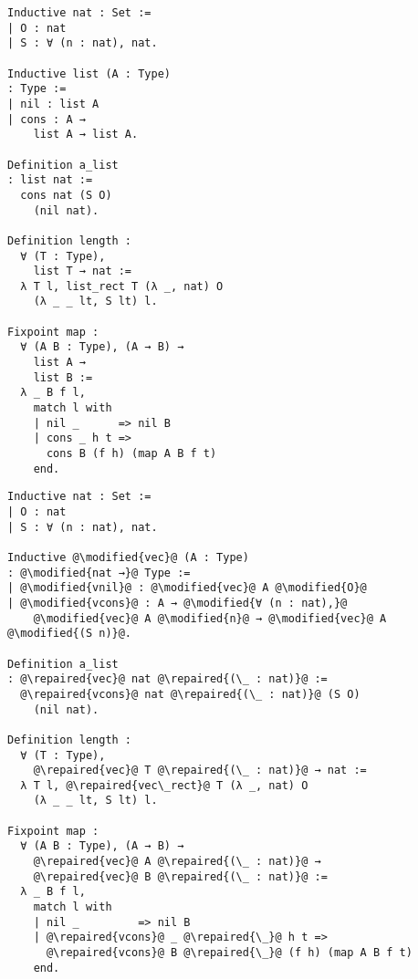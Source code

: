 \begin{figure*}[!htp]

  \noindent%
  \begin{minipage}[t]{0.50\textwidth}
    \begin{verbatim}
Inductive nat : Set :=
| O : nat
| S : ∀ (n : nat), nat.

Inductive list (A : Type)
: Type :=
| nil : list A
| cons : A →
    list A → list A.

Definition a_list
: list nat :=
  cons nat (S O)
    (nil nat).

Definition length :
  ∀ (T : Type),
    list T → nat :=
  λ T l, list_rect T (λ _, nat) O
    (λ _ _ lt, S lt) l.

Fixpoint map :
  ∀ (A B : Type), (A → B) →
    list A →
    list B :=
  λ _ B f l,
    match l with
    | nil _      => nil B
    | cons _ h t =>
      cons B (f h) (map A B f t)
    end.
  \end{verbatim}
\end{minipage}%
\begin{minipage}[t]{0.50\textwidth}
  \begin{verbatim}
Inductive nat : Set :=
| O : nat
| S : ∀ (n : nat), nat.

Inductive @\modified{vec}@ (A : Type)
: @\modified{nat →}@ Type :=
| @\modified{vnil}@ : @\modified{vec}@ A @\modified{O}@
| @\modified{vcons}@ : A → @\modified{∀ (n : nat),}@
    @\modified{vec}@ A @\modified{n}@ → @\modified{vec}@ A @\modified{(S n)}@.

Definition a_list
: @\repaired{vec}@ nat @\repaired{(\_ : nat)}@ :=
  @\repaired{vcons}@ nat @\repaired{(\_ : nat)}@ (S O)
    (nil nat).

Definition length :
  ∀ (T : Type),
    @\repaired{vec}@ T @\repaired{(\_ : nat)}@ → nat :=
  λ T l, @\repaired{vec\_rect}@ T (λ _, nat) O
    (λ _ _ lt, S lt) l.

Fixpoint map :
  ∀ (A B : Type), (A → B) →
    @\repaired{vec}@ A @\repaired{(\_ : nat)}@ →
    @\repaired{vec}@ B @\repaired{(\_ : nat)}@ :=
  λ _ B f l,
    match l with
    | nil _         => nil B
    | @\repaired{vcons}@ _ @\repaired{\_}@ h t =>
      @\repaired{vcons}@ B @\repaired{\_}@ (f h) (map A B f t)
    end.
  \end{verbatim}
\end{minipage}

\caption{ We demonstrate the propagation of repairs after an inductive
definition is modified.  On the left, the original program.  On the right, we
highlight the user-modified parts in yellow.  The computed repairs are
highlighted in green. }

\label{listtovec}

\end{figure*}
